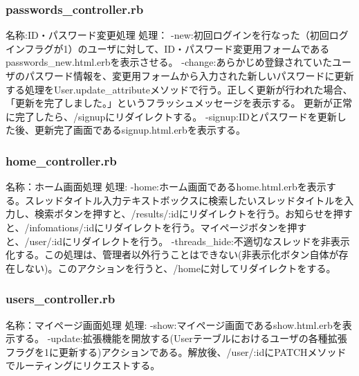 \documentclass[a4j]{jarticle}
\begin{document}
\subsubsection{passwords\_controller.rb}
\noindent 名称:ID・パスワード変更処理	\newline
処理：\newline
-new:初回ログインを行なった（初回ログインフラグが1）のユーザに対して、ID・パスワード変更用フォームであるpasswords\_new.html.erbを表示させる。\newline
-change:あらかじめ登録されていたユーザのパスワード情報を、変更用フォームから入力された新しいパスワードに更新する処理をUser.update\_attributeメソッドで行う。正しく更新が行われた場合、「更新を完了しました。」というフラッシュメッセージを表示する。
更新が正常に完了したら、/signupにリダイレクトする。\newline
-signup:IDとパスワードを更新した後、更新完了画面であるsignup.html.erbを表示する。




\subsubsection{home\_controller.rb}
\noindent 名称：ホーム画面処理 \newline
処理:\newline
-home:ホーム画面であるhome.html.erbを表示する。スレッドタイトル入力テキストボックスに検索したいスレッドタイトルを入力し、検索ボタンを押すと、/results/:idにリダイレクトを行う。お知らせを押すと、/infomations/:idにリダイレクトを行う。マイページボタンを押すと、/user/:idにリダイレクトを行う。\newline
-threads\_hide:不適切なスレッドを非表示化する。この処理は、管理者以外行うことはできない(非表示化ボタン自体が存在しない)。このアクションを行うと、/homeに対してリダイレクトをする。



\subsubsection{users\_controller.rb}
\noindent 名称：マイページ画面処理 \newline
処理:\newline
-show:マイページ画面であるshow.html.erbを表示する。\newline
-update:拡張機能を開放する(Userテーブルにおけるユーザの各種拡張フラグを1に更新する)アクションである。解放後、/user/:idにPATCHメソッドでルーティングにリクエストする。
\end{document}
